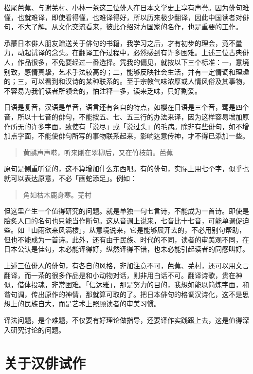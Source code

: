 {  松尾芭蕉、与谢芜村、小林一茶这三位俳人在日本文学史上享有声誉。因为俳句难懂，也就难译，即使看得懂，也难译得好，所以历来极少翻译，因此中国读者对俳句，不大了解。从文化交流看来，彼此介绍对方国家的名作，也是重要的工作。

  承蒙日本俳人朋友赠送关于俳句的书籍，我学习之后，才有初步的理会，竟不量力，动起试译的念头。在翻译工作过程中，必然感到有许多困难。上述三位古典俳人，作品很多，不免要经过一番选择。凭我的偏见，就按以下三个标准：一，意境别致，感情真挚，艺术手法较高的；二，能够反映社会生活，并有一定情调和理趣的；三，可以看到和汉诗的某种联系的。至于宗教气味浓厚或人情风俗及其事物，不容易为我们读者所领会的，怕注释一多，读来乏味，只好割爱。

  日语是复音，汉语是单音，语言还有各自的特点，如樱在日语是三个音，莺是四个音，所以十七音的俳句，不能按五、七、五三行的办法来译，因为这样容易增加原作所无的许多字面，致使有「说尽」或「说过头」的毛病。除非有些俳句，如不增加点字面，不能使俳句所写的事物联系起来，影响达意传神，才不得已添加一些。

  \begin{quote}
      黄鹂声声啭，听来刚在翠柳后，又在竹枝前。\hfill 芭蕉
  \end{quote}

  原句是侧重听觉的，这不算增加什么东西吧。有的俳句，实际上用七个字，似乎也就可以表达原意，不必「画蛇添足」。例如：

  \begin{quote}
      角如枯木鹿身寒。\hfill 芜村
  \end{quote}

  但这里产生一个值得研究的问题。就是单独一句七言诗，不能成为一首诗。即使是脍炙人口的名句也只能当作断句。这从音调上说来，七音比十七音，可能单调促迫些。如「山雨欲来风满楼」，从意境说来，它是能够展开去的，不必用别句帮助，但也不能成为一首诗。此外，还有由于民族、时代的不同，读者的审美观不同，在日本公认是佳句，未必能译得好，纵然译得不错，也未必能引起读者的同感叫好。

  上述三位俳人的俳句，有各自的风格，非加注意不可，芭蕉、芜村，还可以用文言翻译，而一茶的很多作品是和小动物对话，则非用白话不可。翻译诗歌，贵在神似，借体投魂，非常困难。「信达雅」，那是努力的目的，我想如能以简炼字面，和谐句调，传出原作的神情，那就算可取的了。把日本俳句的格调汉诗化，这不是思想上的民族自大，而是艺术上照顾读者的审美习惯。

  译法问题，是个难题，不仅要有好理论做指导，还要译作实践跟上去，这是值得深入研究讨论的问题。

  \section*{\FS 关于汉俳试作}

}

